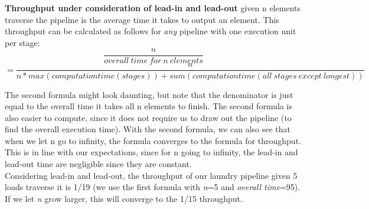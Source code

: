 \documentclass[main.tex]{subfiles}
\begin{document}
\begin{definition}
    \textbf{Throughput under consideration of lead-in and lead-out} given n elements traverse the pipeline is the average time it takes to output an element. This throughput can be calculated as follows for \textit{any} pipeline with one execution unit per stage:
    \begin{equation*}
      \frac{n}{overall\ time\ for\ n\ elements}
    \end{equation*}
    \begin{equation*}
      =\frac{n}{n*max(computationtime(stages))+ sum(computationtime(all\ stages\ except\ longest))}
    \end{equation*}
\end{definition}
The second formula might look daunting, but note that the denominator is just equal to the overall time it takes all n elements to finish. The second formula is also easier to compute, since it does not require us to draw out the pipeline (to find the overall execution time). With the second formula, we can also see that when we let n go to infinity, the formula converges to the formula for throughput. This is in line with our expectations, since for n going to infinity, the lead-in and lead-out time are negligible since they are constant.\\
Considering lead-in and lead-out, the throughput of our laundry pipeline given 5 loads traverse it is 1/19 (we use the first formula with \textit{n}=5 and \textit{overall time}=95). If we let \textit{n} grow larger, this will converge to the 1/15 throughput.
\end{document}
